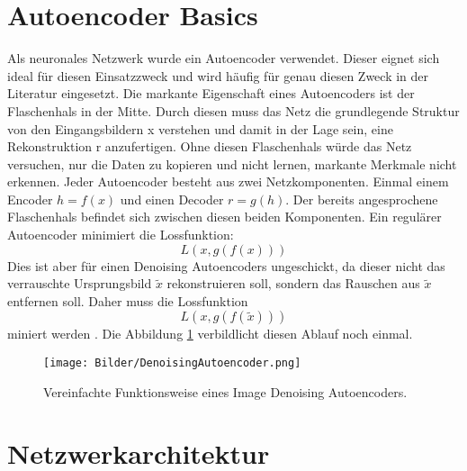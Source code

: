 \documentclass[conference]{IEEEtran}
\begin{document}
\section{Autoencoder Basics}
Als neuronales Netzwerk wurde ein Autoencoder verwendet. Dieser eignet sich ideal für diesen Einsatzzweck und wird häufig für genau diesen Zweck in der Literatur eingesetzt\cite{3}.
Die markante Eigenschaft eines Autoencoders ist der Flaschenhals in der Mitte. Durch diesen muss das Netz die grundlegende Struktur von den Eingangsbildern x verstehen und damit in der Lage sein, eine Rekonstruktion r anzufertigen. Ohne diesen Flaschenhals würde das Netz versuchen, nur die Daten zu kopieren und nicht lernen, markante Merkmale nicht erkennen. Jeder Autoencoder besteht aus zwei Netzkomponenten. Einmal einem Encoder $h = f(x)$ und einen Decoder $r = g(h)$. Der bereits angesprochene Flaschenhals befindet sich zwischen diesen beiden Komponenten. Ein regulärer Autoencoder minimiert die Lossfunktion:
\[ L(x,g(f(x))) \]
 Dies ist aber für einen Denoising Autoencoders ungeschickt, da dieser nicht das verrauschte Ursprungsbild $\tilde{x}$ rekonstruieren soll, sondern das Rauschen aus $\tilde{x}$ entfernen soll. Daher muss die Lossfunktion
\[ L(x,g(f(\tilde{x}))) \]
miniert werden \cite{3}. Die Abbildung \ref{Denoising} verbildlicht diesen Ablauf noch einmal.
\begin{figure}[h]
	\begin{center}
		\texttt{[image: Bilder/DenoisingAutoencoder.png]}
		\caption{Vereinfachte Funktionsweise eines Image Denoising Autoencoders\cite{1-2}.}
		\label{Denoising}
	\end{center}
\end{figure}

\section{Netzwerkarchitektur}
\end{document}
